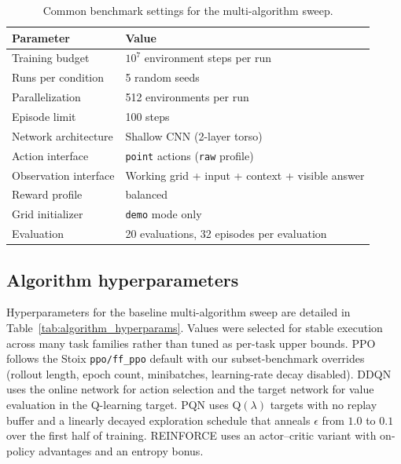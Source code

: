 \begin{table}[htbp]
\centering
\caption{Common benchmark settings for the multi-algorithm sweep.}
\label{tab:baseline_common_settings}
\small
\begin{tabular}{@{}ll@{}}
\toprule
\textbf{Parameter} & \textbf{Value} \\
\midrule
Training budget & $10^7$ environment steps per run \\
Runs per condition & 5 random seeds \\
Parallelization & 512 environments per run \\
Episode limit & 100 steps \\
Network architecture & Shallow CNN (2-layer torso) \\
Action interface & \texttt{point} actions (\texttt{raw} profile) \\
Observation interface & Working grid + input + context + visible answer \\
Reward profile & balanced \\
Grid initializer & \texttt{demo} mode only \\
Evaluation & 20 evaluations, 32 episodes per evaluation \\
\bottomrule
\end{tabular}
\end{table}

\subsection{Algorithm hyperparameters}
\label{app:baseline_hyperparameters}

Hyperparameters for the baseline multi-algorithm sweep are detailed in Table~\ref{tab:algorithm_hyperparams}. Values were selected for stable execution across many task families rather than tuned as per-task upper bounds. PPO follows the Stoix \texttt{ppo/ff\_ppo} default with our subset-benchmark overrides (rollout length, epoch count, minibatches, learning-rate decay disabled). DDQN uses the online network for action selection and the target network for value evaluation in the Q-learning target. PQN uses Q$(\lambda)$ targets with no replay buffer and a linearly decayed exploration schedule that anneals $\epsilon$ from $1.0$ to $0.1$ over the first half of training. REINFORCE uses an actor--critic variant with on-policy advantages and an entropy bonus.


